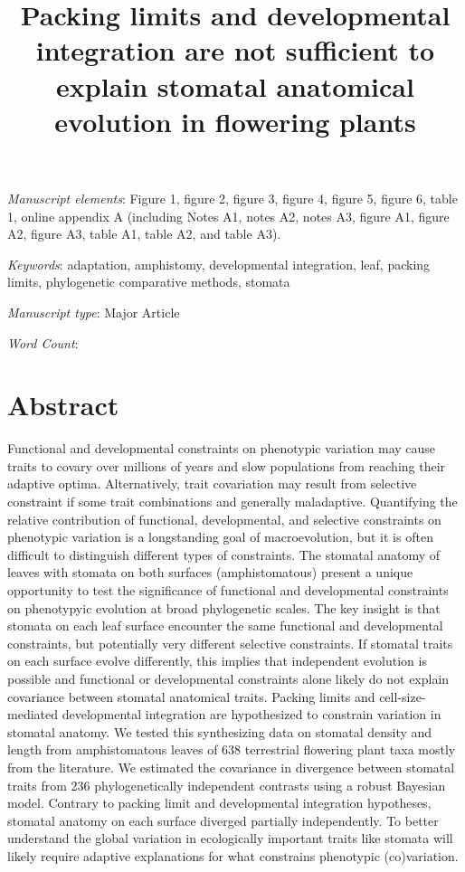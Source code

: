 \documentclass[
  12pt,
]{article}
\title{Packing limits and developmental integration are not sufficient to explain stomatal anatomical evolution in flowering plants}
\author{}
\date{\vspace{-2.5em}}
\author{}
\date{}
\begin{document}
\maketitle

\bigskip

\textit{Manuscript elements}: Figure 1, figure 2, figure 3, figure 4, figure 5, figure 6, table 1, online appendix A (including Notes A1, notes A2, notes A3, figure A1, figure A2, figure A3, table A1, table A2, and table A3).

\bigskip

\textit{Keywords}: adaptation, amphistomy, developmental integration, leaf, packing limits, phylogenetic comparative methods, stomata

\bigskip

\textit{Manuscript type}: Major Article

\bigskip

\textit{Word Count}:

\bigskip

\linenumbers{}
\modulolinenumbers[3]

\newpage{}

\hypertarget{abstract}{%
\section{Abstract}\label{abstract}}

Functional and developmental constraints on phenotypic variation may cause traits to covary over millions of years and slow populations from reaching their adaptive optima. Alternatively, trait covariation may result from selective constraint if some trait combinations and generally maladaptive. Quantifying the relative contribution of functional, developmental, and selective constraints on phenotypic variation is a longstanding goal of macroevolution, but it is often difficult to distinguish different types of constraints. The stomatal anatomy of leaves with stomata on both surfaces (amphistomatous) present a unique opportunity to test the significance of functional and developmental constraints on phenotypyic evolution at broad phylogenetic scales. The key insight is that stomata on each leaf surface encounter the same functional and developmental constraints, but potentially very different selective constraints. If stomatal traits on each surface evolve differently, this implies that independent evolution is possible and functional or developmental constraints alone likely do not explain covariance between stomatal anatomical traits. Packing limits and cell-size-mediated developmental integration are hypothesized to constrain variation in stomatal anatomy. We tested this synthesizing data on stomatal density and length from amphistomatous leaves of 638 terrestrial flowering plant taxa mostly from the literature. We estimated the covariance in divergence between stomatal traits from 236 phylogenetically independent contrasts using a robust Bayesian model. Contrary to packing limit and developmental integration hypotheses, stomatal anatomy on each surface diverged partially independently. To better understand the global variation in ecologically important traits like stomata will likely require adaptive explanations for what constrains phenotypic (co)variation.
\end{document}
